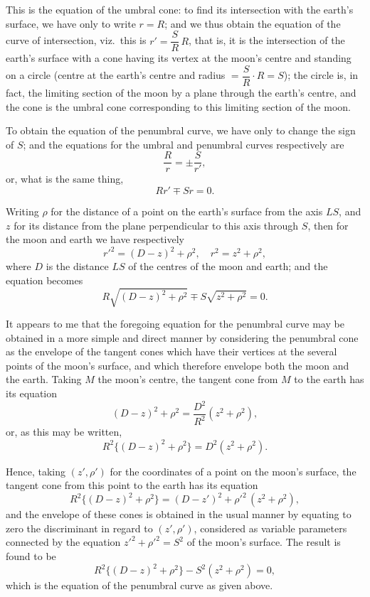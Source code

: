 \documentclass[11pt,a4paper]{article}
\theoremstyle{definition}
\begin{document}
This is the equation of the umbral cone: to find its intersection with the earth's surface,
we have only to write $r=R$; and we thus obtain the equation of the curve of intersection,
viz.~this is $r'=\dfrac{S}{R}\,R$, that is, it is the intersection of the earth's surface with a cone
having its vertex at the moon's centre and standing on a circle (centre at the earth's
centre and radius $=\dfrac{S}{R}\cdot R=S$); the circle is, in fact, the limiting section of the moon
by a plane through the earth's centre, and the cone is the umbral cone corresponding
to this limiting section of the moon.

\newpage
\noindent
To obtain the equation of the penumbral curve, we have only to change the sign of
$S$; and the equations for the umbral and penumbral curves respectively are
\[
\frac{R}{r} = \pm\frac{S}{r'},
\]
or, what is the same thing,
\[
Rr' \mp Sr = 0.
\]

Writing $\rho$ for the distance of a point on the earth's surface from the axis $LS$, and $z$ for
its distance from the plane perpendicular to this axis through $S$, then for the moon and
earth we have respectively
\[
r'^2 = (D-z)^2 + \rho^2, \quad r^2 = z^2 + \rho^2,
\]
where $D$ is the distance $LS$ of the centres of the moon and earth; and the equation
becomes
\[
R\sqrt{(D-z)^2+\rho^2} \mp S\sqrt{z^2+\rho^2} = 0.
\]

It appears to me that the foregoing equation for the penumbral curve may be
obtained in a more simple and direct manner by considering the penumbral cone as the
envelope of the tangent cones which have their vertices at the several points of the moon's
surface, and which therefore envelope both the moon and the earth. Taking $M$ the moon's
centre, the tangent cone from $M$ to the earth has its equation
\[
(D-z)^2 + \rho^2 = \frac{D^2}{R^2}(z^2+\rho^2),
\]
or, as this may be written,
\[
R^2\{(D-z)^2+\rho^2\} = D^2(z^2+\rho^2).
\]

\newpage
\noindent
Hence, taking $(z',\rho')$ for the coordinates of a point on the moon's surface, the tangent
cone from this point to the earth has its equation
\[
R^2\{(D-z)^2+\rho^2\} = (D-z')^2 + \rho'^2\,(z^2+\rho^2),
\]
and the envelope of these cones is obtained in the usual manner by equating to zero
the discriminant in regard to $(z',\rho')$, considered as variable parameters connected by the
equation $z'^2+\rho'^2=S^2$ of the moon's surface. The result is found to be
\[
R^2\{(D-z)^2+\rho^2\} - S^2(z^2+\rho^2) = 0,
\]
which is the equation of the penumbral curve as given above.
\end{document}
